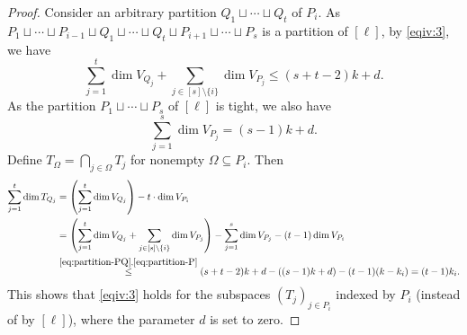 \documentclass[10pt,a4paper]{amsart}
\begin{document}
\begin{proof}
Consider an arbitrary partition $Q_1\sqcup \cdots\sqcup Q_t$ of $P_i$. As $P_1\sqcup\cdots \sqcup P_{i-1}\sqcup Q_1\sqcup \cdots \sqcup Q_t\sqcup P_{i+1}\sqcup\cdots\sqcup P_s$ is a partition of $[\ell]$, by \cref{eqiv:3}, we have
\begin{equation}\label{eq:partition-PQ}
\sum_{j=1}^t \dim V_{Q_j}+\sum_{j\in [s]\setminus \{i\}}\dim V_{P_j} \leq (s+t-2)k+d.
\end{equation}
As the partition $P_1\sqcup\cdots\sqcup P_s$ of $[\ell]$ is tight, we also have
\begin{equation}\label{eq:partition-P}
\sum_{j=1}^s\dim V_{P_j} = (s-1)k+d.
\end{equation}
Define $T_\Omega=\bigcap_{j\in\Omega} T_j$ for nonempty $\Omega\subseteq P_i$.
Then
\begin{align*}
\sum_{j=1}^t \dim T_{Q_j} &=\left(\sum_{j=1}^t \dim V_{Q_j}\right)-t\cdot \dim V_{P_i}\\
&=\left(\sum_{j=1}^t \dim V_{Q_j}+\sum_{j\in [s]\setminus \{i\}}\dim V_{P_j}\right)- \sum_{j=1}^s\dim V_{P_j}-(t-1)\dim V_{P_i}\\
&\stackrel{\eqref{eq:partition-PQ},\eqref{eq:partition-P}}{\leq} (s+t-2)k+d-((s-1)k+d)-(t-1)(k-k_i)=(t-1)k_i.
\end{align*}
This shows that \cref{eqiv:3} holds for the subspaces $(T_j)_{j\in P_i}$ indexed by $P_i$ (instead of by $[\ell]$), where the parameter $d$ is set to zero.


\end{proof}
\end{document}

